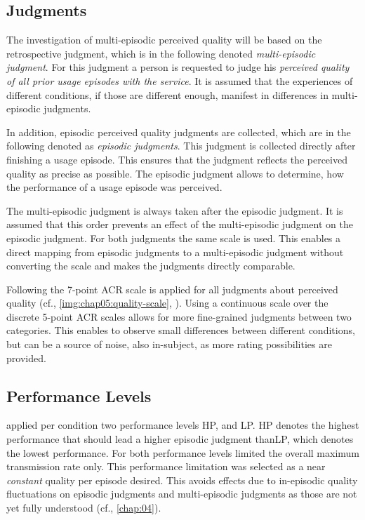 \subsection{Judgments}
The investigation of multi-episodic perceived quality will be based on the retrospective judgment, which is in the following denoted \emph{multi-episodic judgment}.
For this judgment a person is requested to judge his \emph{perceived quality of all prior usage episodes with the service}.
It is assumed that the experiences of different conditions, if those are different enough, manifest in differences in multi-episodic judgments.

In addition, episodic perceived quality judgments are collected, which are in the following denoted as \emph{episodic judgments}.
This judgment is collected directly after finishing a usage episode.
This ensures that the judgment reflects the perceived quality as precise as possible.
The episodic judgment allows to determine, how the performance of a usage episode was perceived.

The multi-episodic judgment is always taken after the episodic judgment.
It is assumed that this order prevents an effect of the multi-episodic judgment on the episodic judgment.
For both judgments the same scale is used.
This enables a direct mapping from episodic judgments to a multi-episodic judgment without converting the scale and makes the judgments directly comparable.

Following \cite{moller_single-call_2011} the 7-point \ac{ACR} scale is applied for all judgments about perceived quality (cf., \autoref{img:chap05:quality-scale}, ).
Using a continuous scale over the discrete 5-point \ac{ACR} scales allows for more fine-grained judgments between two categories.
This enables to observe small differences between different conditions, but can be a source of noise, also in-subject, as more rating possibilities are provided.

\subsection{Performance Levels}
\cite{moller_single-call_2011} applied per condition two performance levels \acf{HP}, and \acf{LP}.
\ac{HP} denotes the highest performance that should lead a higher episodic judgment than\ac{LP}, which denotes the lowest performance.
For both performance levels \cite{moller_single-call_2011} limited the overall maximum transmission rate only.
This performance limitation was selected as a near \emph{constant} quality per episode desired. %
This avoids effects due to in-episodic quality fluctuations on episodic judgments and multi-episodic judgments as those are not yet fully understood (cf., \autoref{chap:04}).

